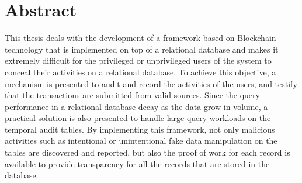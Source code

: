 \chapter*{Abstract}

 This thesis deals with the development of a framework based on Blockchain technology that is implemented on top of a relational database and makes it extremely difficult for the privileged or unprivileged users of the system to conceal their activities on a relational database. To achieve this objective, a mechanism is presented to audit and record the activities of the users, and testify that the transactions are submitted from valid sources. Since the query performance in a relational database decay as the data grow in volume, a practical solution is also presented to handle large query workloads on the temporal audit tables. By implementing this framework, not only malicious activities such as intentional or unintentional fake data manipulation on the tables are discovered and reported, but also the proof of work for each record is available to provide transparency for all the records that are stored in the database.
 